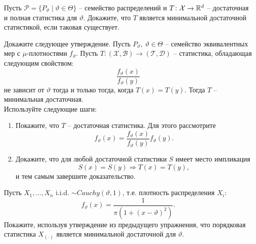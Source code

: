 \begin{exc}
	Пусть $\mathcal{P}= \{ P_\vartheta \mid \vartheta \in \Theta \}$ -- семейство распределений и $T\colon\mathcal{X} \rightarrow \mathbb{R}^d$ -- достаточная и полная статистика для $\vartheta$. Докажите, что $T$ является минимальной достаточной статистикой, если таковая существует.
\end{exc}

\begin{exc}
	Докажите следующее утверждение. Пусть $P_\vartheta,\ \vartheta \in \Theta$ -- семейство эквивалентных мер с $\mu$-плотностями $f_\vartheta$. Пусть $T\colon (\mathcal{X}, \mathcal{B}) \rightarrow (\mathcal{T}, \mathcal{D})$ -- статистика, обладающая следующим свойством:
	\[\frac{f_\vartheta(x)}{f_\vartheta(y)} \]
	не зависит от $\vartheta$ тогда и только тогда, когда $T(x) = T(y)$. Тогда $T$ -- минимальная достаточная. \\
	Используйте следующие шаги:
	\begin{enumerate}
		\item Покажите, что $T$ -- достаточная статистика. Для этого рассмотрите
		\[f_\vartheta(x) = \frac{f_\vartheta(x)}{f_\vartheta(y)} f_\vartheta(y). \]
		\item Докажите, что для любой достаточной статистики $S$ имеет место импликация
		\[ S(x) = S(y) \Longrightarrow T(x) = T(y), \]
		и тем самым завершите доказательство.
	\end{enumerate}
\end{exc}

\begin{exc}
	Пусть $X_1, \dots, X_n$ i.i.d. $\sim Cauchy(\vartheta, 1)$, т.е. плотность распределения $X_i$:
	\[ f_\vartheta(x) = \frac{1}{\pi (1 + (x-\vartheta)^2)}. \]
	Покажите, используя утверждение из предыдущего упражнения, что порядковая статистика $X_{(\cdot)}$ является минимальной достаточной для $\vartheta$.
\end{exc}